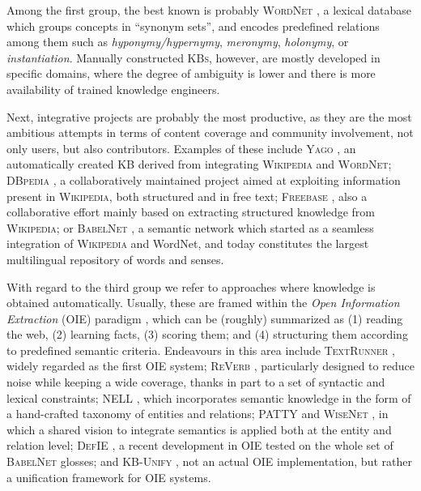 Among the first group, the best known is probably \textsc{WordNet} \citep{Miller1995}, a lexical database which groups concepts in ``synonym sets'', and encodes predefined relations among them such as \textit{hyponymy/hypernymy}, \textit{meronymy}, \textit{holonymy}, or \textit{instantiation}. Manually constructed \textsc{KBs}, however, are mostly developed in specific domains, where the degree of ambiguity is lower and there is more availability of trained knowledge engineers.

Next, integrative projects are probably the most productive, as they are the most ambitious attempts in terms of content coverage and community involvement, not only users, but also contributors. Examples of these include \textsc{Yago} \citep{Suchaneketal2007}, an automatically created \textsc{KB} derived from integrating \textsc{Wikipedia} and \textsc{WordNet}; \textsc{DBpedia} \citep{Lehmanetal2014}, a collaboratively maintained project aimed at exploiting information present in \textsc{Wikipedia}, both structured and in free text; \textsc{Freebase} \citep{Bollacketal2008}, also a collaborative effort mainly based on extracting structured knowledge from \textsc{Wikipedia}; or \textsc{BabelNet} \citep{NavigliPonzetto2012}, a semantic network which started as a seamless integration of \textsc{Wikipedia} and WordNet, and today constitutes the largest multilingual repository of words and senses.

With regard to the third group we refer to approaches where knowledge is obtained automatically. Usually, these are framed within the \textit{Open Information Extraction} (OIE) paradigm \citep{Bankoetal2007}, which can be (roughly) summarized as (1) reading the web, (2) learning facts, (3) scoring them; and (4) structuring them according to predefined semantic criteria. Endeavours in this area include \textsc{TextRunner} \citep{Bankoetal2007}, widely regarded as the first OIE system; \textsc{ReVerb} \citep{Fader2011}, particularly designed to reduce noise while keeping a wide coverage, thanks in part to a set of syntactic and lexical constraints; \textsc{NELL} \citep{Carlson2010}, which incorporates semantic knowledge in the form of a hand-crafted taxonomy of entities and relations; \textsc{PATTY} \citep{Nakasholeetal2012} and \textsc{WiseNet} \citep{MoroandNavigli2012,MoroandNavigli2013}, in which a shared vision to integrate semantics is applied both at the entity and relation level; \textsc{DefIE} \citep{DelliBovietal2015b}, a recent development in OIE tested on the whole set of \textsc{BabelNet} glosses; and \textsc{KB-Unify} \citep{DelliBovietal2015}, not an actual OIE implementation, but rather a unification framework for OIE systems.

